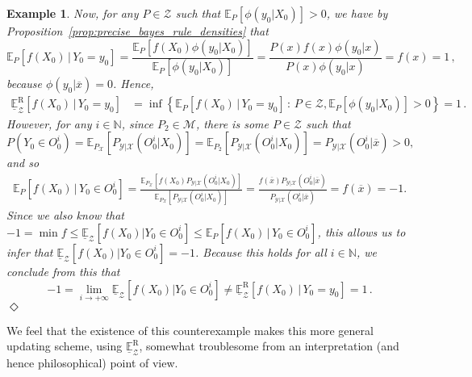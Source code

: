\documentclass[3p]{elsarticle}
\newtheorem{example}{Example}[section]
\newcommand{\nats}{\mathbb{N}}
\newcommand{\states}{\mathcal{X}}
\newcommand{\observs}{\mathcal{Y}}
\newcommand{\exampleend}{\hfill$\Diamond$}
\begin{document}
\begin{example}
Now, for any $P\in\mathcal{Z}$ such that $\mathbb{E}_{P}[\phi(y_0\vert X_0)]>0$, we have by Proposition~\ref{prop:precise_bayes_rule_densities} that
\begin{equation*}
\mathbb{E}_{P}[f(X_0)\,\vert\,Y_0=y_0] = \frac{\mathbb{E}_{P}[f(X_0)\phi(y_0\vert X_0)]}{\mathbb{E}_{P}[\phi(y_0\vert X_0)]} = \frac{P(x)f(x)\phi(y_0\vert x)}{P(x)\phi(y_0\vert x)} = f(x) = 1\,,
\end{equation*}
because $\phi(y_0\vert \overline{x})=0$. Hence,
\begin{align*}
\underline{\mathbb{E}}_\mathcal{Z}^\mathrm{R}[f(X_0)\,\vert\, Y_0=y_0] &= \inf\left\{ \mathbb{E}_{P}[f(X_0)\,\vert\,Y_0=y_0]\,:\,P\in\mathcal{Z}, \mathbb{E}_{P}[\phi(y_0\vert X_0)]>0  \right\} = 1\,.
\end{align*}
However, for any $i\in\nats$, since $P_2\in\mathcal{M}$, there is some $P\in\mathcal{Z}$ such that 
\begin{equation*}
P(Y_0\in O_0^i)=\mathbb{E}_{P_\states}[P_{\observs\vert\states}(O_0^i\vert X_0)]=\mathbb{E}_{P_2}[P_{\observs\vert\states}(O_0^i\vert X_0)]=P_{\observs\vert\states}(O_0^i\vert \overline{x})>0,
\end{equation*}
and so
\begin{align*}
\mathbb{E}_{P}[f(X_0)\,\vert\,Y_0\in O_0^i] = \frac{\mathbb{E}_{P_\states}[f(X_0)P_{\observs\vert\states}(O_0^i\vert X_0)]}{\mathbb{E}_{P_\states}[P_{\observs\vert\states}(O_0^i\vert X_0)]} = \frac{f(\overline{x})P_{\observs\vert\states}(O_0^i\vert \overline{x})}{P_{\observs\vert\states}(O_0^i\vert \overline{x})} = f(\overline{x}) = -1.
\end{align*}
Since we also know that $-1=\min f \leq \underline{\mathbb{E}}_\mathcal{Z}[f(X_0)\vert Y_0\in O_0^i] \leq \mathbb{E}_{P}[f(X_0)\,\vert\,Y_0\in O_0^i]$, this allows us to infer that $\underline{\mathbb{E}}_\mathcal{Z}[f(X_0)\vert Y_0\in O_0^i]=-1$.
Because this holds for all $i\in\nats$, we conclude from this that
\begin{equation*}
-1 =  \lim_{i\to+\infty} \underline{\mathbb{E}}_\mathcal{Z}[f(X_0)\vert Y_0\in O_0^i] \neq \underline{\mathbb{E}}_\mathcal{Z}^\mathrm{R}[f(X_0)\,\vert\, Y_0=y_0] = 1\,.
\end{equation*}
\exampleend
\end{example}

We feel that the existence of this counterexample makes this more general updating scheme, using $\underline{\mathbb{E}}_\mathcal{Z}^\mathrm{R}$, somewhat troublesome from an interpretation (and hence philosophical) point of view.
\end{document}
